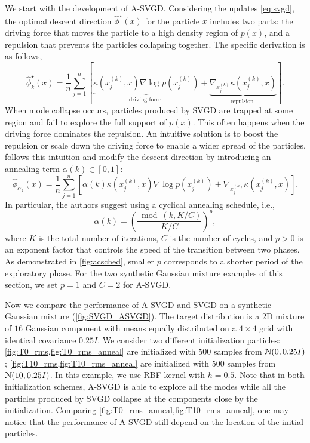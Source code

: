 We start with the development of A-SVGD. Considering the updates
\cref{eq:svgd}, the optimal descent direction $ \hat{\phi}^{\star}(x)$ for
the particle $x$ includes two parts: the driving force that moves the
particle to a high density region of $p(x)$, and a repulsion that prevents
the particles collapsing together. The specific derivation is as follows,
\[
    \hat{\phi}_k^{\star}(x)=\frac{1}{n} \sum_{j=1}^{n}\left[\underbrace{\kappa\left(x_{j}^{(k)}, x\right) \nabla \log p\left(x_{j}^{(k)}\right)}_{\text {driving force }}+\underbrace{\nabla_{x_{j}^{(k)}} \kappa\left(x_{j}^{(k)}, x\right)}_{\text {repulsion }}\right].
\]
When mode collapse occurs, particles produced by SVGD are trapped at some
region and fail to explore the full support of $p(x)$. This often happens
when the driving force dominates the repulsion. An intuitive solution is to
boost the repulsion or scale down the driving force to enable a wider spread
of the particles.
\citet{d2021annealed} follows this intuition and modify the descent direction
by introducing an annealing term $\alpha(k) \in [0, 1]$:
\[\label{eq:asvgd}
    \hat{\phi}_{\alpha_k}\left(x\right) = \frac{1}{n} \sum_{j=1}^{n}\left[ \alpha(k)\kappa\left(x_{j}^{(k)}, x\right) \nabla \log p\left(x_{j}^{(k)}\right)+ \nabla_{x_{j}^{(k)}} \kappa\left(x_{j}^{(k)}, x\right)\right].
\]
In particular, the authors suggest using a cyclical annealing schedule, i.e., 
\[\label{eq:anneal_sched}
    \alpha(k)=\left(\frac{\bmod (k, K / C)}{K / C}\right)^{p},
\]
where $K$ is the total number of iterations, $C$ is the number of cycles, and
$p > 0$ is an exponent factor that controls the speed of the transition
between two phases. As demonstrated in \cref{fig:acsched}, smaller $p$
corresponds to a shorter period of the exploratory phase. For the two synthetic Gaussian mixture examples of this section, we set $ p = 1$ and $C = 2$ for A-SVGD. 

Now we compare the performance of A-SVGD and SVGD on a synthetic Gaussian
mixture (\cref{fig:SVGD_ASVGD}). The target distribution is a 2D mixture of
$16$ Gaussian component with means equally distributed on a $4 \times 4$ grid
with identical covariance $0.25I$. We consider two different initialization
particles: \cref{fig:T0_rms,fig:T0_rms_anneal} are initialized with $500$
\iid samples from $\mathcal{N}(0, 0.25I)$;
\cref{fig:T10_rms,fig:T10_rms_anneal} are initialized with $500$ \iid samples
from $\mathcal{N}(10, 0.25I)$. In this example, we use RBF kernel with 
$h =0.5$. Note that in both initialization schemes, A-SVGD is able to explore all
the modes while all the particles produced by SVGD collapse at the components
close by the initialization. Comparing
\cref{fig:T0_rms_anneal,fig:T10_rms_anneal}, one may notice that the
performance of A-SVGD still depend on the location of the initial particles.

